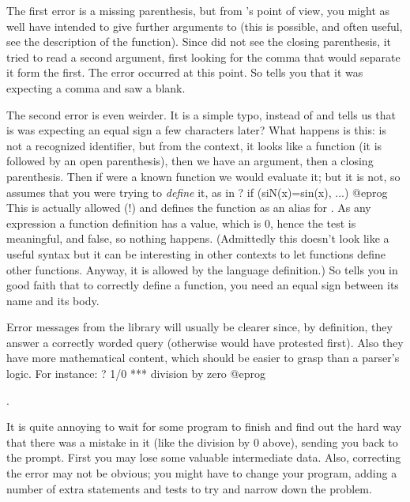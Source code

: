 The first error is a missing parenthesis, but from 's point of view, you
might as well have intended to give further arguments to  (this is
possible, and often useful, see the description of the function). Since
did not see the closing parenthesis, it tried to read a second argument,
first looking for the comma that would separate it form the first. The error
occurred at this point. So  tells you that it was expecting a comma and saw
a blank.

The second error is even weirder. It is a simple typo,  instead of
 and  tells us that is was expecting an equal sign a few
characters later? What happens is this:  is not a recognized
identifier, but from the context, it looks like a function (it is followed by
an open parenthesis), then we have an argument, then a closing parenthesis.
Then if  were a known function we would evaluate it; but it is not,
so  assumes that you were trying to \emph{define} it, as in
\bprog
? if (siN(x)=sin(x), ...)
@eprog
This is actually allowed (!) and defines the function  as an alias for
. As any expression a function definition has a value, which is $0$,
hence the test is meaningful, and false, so nothing happens. (Admittedly this
doesn't look like a useful syntax but it can be interesting in other contexts
to let functions define other functions. Anyway, it is allowed by the
language definition.)  So  tells you in good faith that to correctly define
a function, you need an equal sign between its name and its body.

Error messages from the library will usually be clearer since, by
definition, they answer a correctly worded query (otherwise  would have
protested first). Also they have more mathematical content, which should be
easier to grasp than a parser's logic. For instance:
\bprog
? 1/0
  ***   division by zero
@eprog

.\label{se:errorrec}

It is quite annoying to wait for some program to finish and find out the hard
way that there was a mistake in it (like the division by 0 above), sending
you back to the prompt. First you may lose some valuable intermediate data.
Also, correcting the error may not be obvious; you might have to change your
program, adding a number of extra statements and tests to try and narrow down
the problem.

